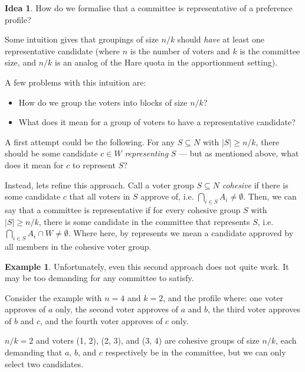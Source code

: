 \documentclass{book}
\theoremstyle{plain}
\theoremstyle{definition}
\newtheorem{example}[theorem]{Example}
\newtheorem{idea}[theorem]{Idea}
\theoremstyle{remark}
\begin{document}
\begin{idea}
    How do we formalise that a 
    committee is representative of a preference profile?

    Some intuition gives that 
    groupings of size $n / k$ 
    should \emph{have} at least one 
    representative candidate
    (where $n$ is the number of voters and $k$ is the committee size, and 
    $n/k$ is an analog of the Hare quota in the apportionment setting).

    A few problems with this intuition are:
    \begin{itemize}
        \item How do we group the voters into blocks of size $n / k$?
        \item What does it mean for a group of voters to have a representative candidate?
    \end{itemize}

    A first attempt could be the following.
    For any $S \subseteq N$ with $|S| \geq n / k$,
    there should be some candidate $c \in W$ \emph{representing} $S$ ---
    but as mentioned above, what does it mean for $c$ to represent $S$?

    Instead, lets refine this approach.
    Call a voter group $S \subseteq N$ \emph{cohesive} if there is some candidate
    $c$ that all voters in $S$ approve of, i.e. $\bigcap_{i \in S} A_i \neq \emptyset$.
    Then, we can say that a committee is representative if for every cohesive group $S$ with
    $|S| \geq n / k$, there is some candidate in the committee that represents $S$,
    i.e. $\bigcap_{i \in S} A_i \cap W \neq \emptyset$.
    Where here, by represents we mean a candidate approved by all members
    in the cohesive voter group.
\end{idea}

\begin{example}
    Unfortunately, even this second approach does not quite work.
    It may be too demanding for any 
    committee to satisfy.

    Consider the example with 
    $n = 4$ and $k = 2$, and the profile where:
    one voter approves of $a$ only,
    the second voter approves of $a$ and $b$,
    the third voter approves of $b$ and $c$, and
    the fourth voter approves of $c$ only.

    $n/k = 2$ and voters (1, 2), (2, 3), and (3, 4) are cohesive groups of size $n/k$, 
    each demanding that $a$, $b$, and $c$ respectively be in the committee, but we can only select two candidates.
\end{example}
\end{document}
